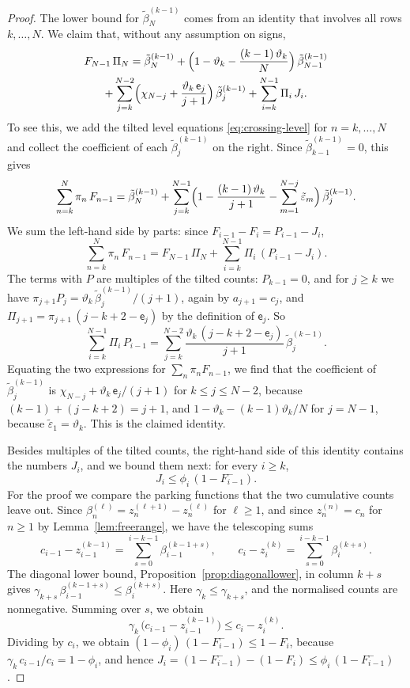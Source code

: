 \documentclass{amsart}
\theoremstyle{definition}
\theoremstyle{remark}
\numberwithin{equation}{section}
\begin{document}
\begin{proof}
The lower bound for $\tilde\beta^{(k-1)}_N$ comes from an identity that involves all rows $k,\dots,N$. We claim that, without any assumption on signs,
\begin{multline}\label{eq:crossing-summed}
F_{N-1}\,\Pi_N=\tilde\beta^{(k-1)}_N+\Bigl(1-\vartheta_k-\frac{(k-1)\,\vartheta_k}{N}\Bigr)\,\tilde\beta^{(k-1)}_{N-1}\\
+\sum_{j=k}^{N-2}\Bigl(\chi_{N-j}+\frac{\vartheta_k\,\mathsf e_j}{j+1}\Bigr)\,\tilde\beta^{(k-1)}_j+\sum_{i=k}^{N-1}\Pi_i\,J_i .
\end{multline}
To see this, we add the tilted level equations \eqref{eq:crossing-level} for $n=k,\dots,N$ and collect the coefficient of each $\tilde\beta^{(k-1)}_j$ on the right. Since $\tilde\beta^{(k-1)}_{k-1}=0$, this gives
\[
\sum_{n=k}^{N}\pi_n\,F_{n-1}=\tilde\beta^{(k-1)}_N+\sum_{j=k}^{N-1}\Bigl(1-\frac{(k-1)\,\vartheta_k}{j+1}-\sum_{m=1}^{N-j}\tilde\varepsilon_m\Bigr)\,\tilde\beta^{(k-1)}_j .
\]
We sum the left-hand side by parts: since $F_{i-1}-F_i=P_{i-1}-J_i$,
\[
\sum_{n=k}^{N}\pi_n\,F_{n-1}=F_{N-1}\,\Pi_N+\sum_{i=k}^{N-1}\Pi_i\,(P_{i-1}-J_i).
\]
The terms with $P$ are multiples of the tilted counts: $P_{k-1}=0$, and for $j\ge k$ we have $\pi_{j+1}P_j=\vartheta_k\,\tilde\beta^{(k-1)}_j/(j+1)$, again by $a_{j+1}=c_j$, and $\Pi_{j+1}=\pi_{j+1}\,(j-k+2-\mathsf e_j)$ by the definition of $\mathsf e_j$. So
\[
\sum_{i=k}^{N-1}\Pi_i\,P_{i-1}=\sum_{j=k}^{N-2}\frac{\vartheta_k\,(j-k+2-\mathsf e_j)}{j+1}\,\tilde\beta^{(k-1)}_j .
\]
Equating the two expressions for $\sum_n\pi_nF_{n-1}$, we find that the coefficient of $\tilde\beta^{(k-1)}_j$ is $\chi_{N-j}+\vartheta_k\,\mathsf e_j/(j+1)$ for $k\le j\le N-2$, because $(k-1)+(j-k+2)=j+1$, and $1-\vartheta_k-(k-1)\vartheta_k/N$ for $j=N-1$, because $\tilde\varepsilon_1=\vartheta_k$. This is the claimed identity.

Besides multiples of the tilted counts, the right-hand side of this identity contains the numbers $J_i$, and we bound them next: for every $i\ge k$,
\[
J_i\le\phi_i\,(1-F^-_{i-1}).
\]
For the proof we compare the parking functions that the two cumulative counts leave out. Since $\beta^{(\ell)}_n=z^{(\ell+1)}_n-z^{(\ell)}_n$ for $\ell\ge 1$, and since $z^{(n)}_n=c_n$ for $n\ge 1$ by Lemma~\ref{lem:freerange}, we have the telescoping sums
\[
c_{i-1}-z^{(k-1)}_{i-1}=\sum_{s=0}^{i-k-1}\beta^{(k-1+s)}_{i-1},\qquad c_i-z^{(k)}_i=\sum_{s=0}^{i-k-1}\beta^{(k+s)}_i .
\]
The diagonal lower bound, Proposition~\ref{prop:diagonallower}, in column $k+s$ gives $\gamma_{k+s}\,\beta^{(k-1+s)}_{i-1}\le\beta^{(k+s)}_i$. Here $\gamma_k\le\gamma_{k+s}$, and the normalised counts are nonnegative. Summing over $s$, we obtain
\[
\gamma_k\,\bigl(c_{i-1}-z^{(k-1)}_{i-1}\bigr)\le c_i-z^{(k)}_i .
\]
Dividing by $c_i$, we obtain $(1-\phi_i)\,(1-F^-_{i-1})\le 1-F_i$, because $\gamma_k\,c_{i-1}/c_i=1-\phi_i$, and hence $J_i=(1-F^-_{i-1})-(1-F_i)\le\phi_i\,(1-F^-_{i-1})$.


\end{proof}
\end{document}
